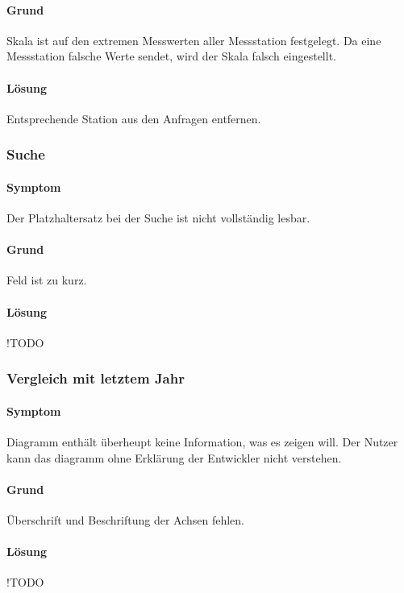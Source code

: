 \paragraph{Grund}
Skala ist auf den extremen Messwerten aller Messstation festgelegt. Da eine Messstation falsche Werte sendet, wird der Skala falsch eingestellt. 

\paragraph{Lösung}
Entsprechende Station aus den Anfragen entfernen.

\subsubsection{Suche}
\paragraph{Symptom}
Der Platzhaltersatz bei der Suche ist nicht vollständig lesbar.

\paragraph{Grund}
Feld  ist zu kurz.

\paragraph{Lösung}
!TODO

\subsubsection{Vergleich mit letztem Jahr}
\paragraph{Symptom}
Diagramm enthält überheupt keine Information, was es zeigen will. Der Nutzer kann das diagramm ohne Erklärung der Entwickler nicht verstehen.

\paragraph{Grund}
Überschrift und Beschriftung der Achsen fehlen.

\paragraph{Lösung}
!TODO

